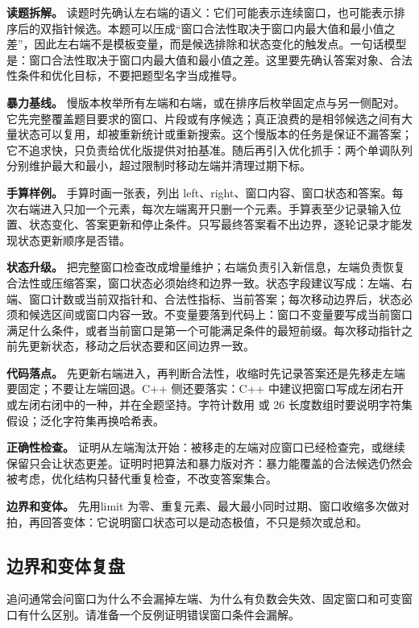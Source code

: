 \textbf{读题拆解。} 读题时先确认左右端的语义：它们可能表示连续窗口，也可能表示排序后的双指针候选。本题可以压成“窗口合法性取决于窗口内最大值和最小值之差”，因此左右端不是模板变量，而是候选排除和状态变化的触发点。一句话模型是：窗口合法性取决于窗口内最大值和最小值之差。这里要先确认答案对象、合法性条件和优化目标，不要把题型名字当成推导。

\textbf{暴力基线。} 慢版本枚举所有左端和右端，或在排序后枚举固定点与另一侧配对。它先完整覆盖题目要求的窗口、片段或有序候选；真正浪费的是相邻候选之间有大量状态可以复用，却被重新统计或重新搜索。这个慢版本的任务是保证不漏答案；它不追求快，只负责给优化版提供对拍基准。随后再引入优化抓手：两个单调队列分别维护最大和最小，超过限制时移动左端并清理过期下标。

\textbf{手算样例。} 手算时画一张表，列出 left、right、窗口内容、窗口状态和答案。每次右端进入只加一个元素，每次左端离开只删一个元素。手算表至少记录输入位置、状态变化、答案更新和停止条件。只写最终答案看不出边界，逐轮记录才能发现状态更新顺序是否错。

\textbf{状态升级。} 把完整窗口检查改成增量维护；右端负责引入新信息，左端负责恢复合法性或压缩答案，窗口状态必须始终和边界一致。状态字段建议写成：左端、右端、窗口计数或当前双指针和、合法性指标、当前答案；每次移动边界后，状态必须和候选区间或窗口内容一致。不变量要落到代码上：窗口不变量要写成当前窗口满足什么条件，或者当前窗口是第一个可能满足条件的最短前缀。每次移动指针之前先更新状态，移动之后状态要和区间边界一致。

\textbf{代码落点。} 先更新右端进入，再判断合法性，收缩时先记录答案还是先移走左端要固定；不要让左端回退。C++ 侧还要落实：C++ 中建议把窗口写成左闭右开或左闭右闭中的一种，并在全题坚持。字符计数用  或 26 长度数组时要说明字符集假设；泛化字符集再换哈希表。

\textbf{正确性检查。} 证明从左端淘汰开始：被移走的左端对应窗口已经检查完，或继续保留只会让状态更差。证明时把算法和暴力版对齐：暴力能覆盖的合法候选仍然会被考虑，优化结构只替代重复检查，不改变答案集合。

\textbf{边界和变体。} 先用limit 为零、重复元素、最大最小同时过期、窗口收缩多次做对拍，再回答变体：它说明窗口状态可以是动态极值，不只是频次或总和。

\subsection{边界和变体复盘}

追问通常会问窗口为什么不会漏掉左端、为什么有负数会失效、固定窗口和可变窗口有什么区别。请准备一个反例证明错误窗口条件会漏解。

